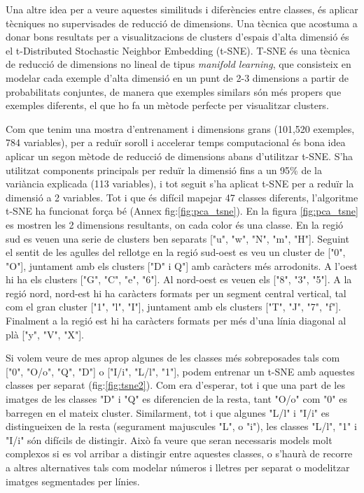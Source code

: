 \documentclass[12pt, spanish]{article}
\begin{document}
Una altre idea per a veure aquestes similituds i diferències entre classes, és aplicar tècniques no supervisades de reducció de dimensions. Una tècnica que acostuma a donar bons resultats per a visualitzacions de clusters d'espais d'alta dimensió és el t-Distributed Stochastic Neighbor Embedding (t-SNE). T-SNE és una tècnica de reducció de dimensions no lineal de tipus \textit{manifold learning}, que consisteix en modelar cada exemple d'alta dimensió en un punt de 2-3 dimensions a partir de probabilitats conjuntes, de manera que exemples similars són més propers que exemples diferents, el que ho fa un mètode perfecte per visualitzar clusters.

Com que tenim una mostra d'entrenament i dimensions grans (101,520 exemples, 784 variables), per a reduïr soroll i accelerar temps computacional és bona idea aplicar un segon mètode de reducció de dimensions abans d'utilitzar t-SNE. S'ha utilitzat components principals per reduïr la dimensió fins a un 95\% de la variància explicada (113 variables), i tot seguit s'ha aplicat t-SNE per a reduïr la dimensió a 2 variables. Tot i que és difícil mapejar 47 classes diferents, l'algoritme t-SNE ha funcionat força bé (Annex fig:\ref{fig:pca_tsne}). En la figura \ref{fig:pca_tsne} es mostren les 2 dimensions resultants, on cada color és una classe. En la regió sud es veuen una serie de clusters ben separats ["u", "w", "N", "m", "H"]. Seguint el sentit de les agulles del rellotge en la regió sud-oest es veu un cluster de ["0", "O"], juntament amb els clusters ["D" i Q"] amb caràcters més arrodonits. A l'oest hi ha els clusters ["G", "C", "e", "6"]. Al nord-oest es veuen els ["8", "3", "5"]. A la regió nord, nord-est hi ha caràcters formats per un segment central vertical, tal com el gran cluster ["1", "l", "I"], juntament amb els clusters ["T", "J", "7", "f"]. Finalment a la regió est hi ha caràcters formats per més d'una línia diagonal al plà ["y", "V", "X"]. 

Si volem veure de mes aprop algunes de les classes més sobreposades tals com ["0", "O/o", "Q", "D"] o ["I/i", "L/l", "1"], podem entrenar un t-SNE amb aquestes classes per separat (fig:\ref{fig:tsne2}). Com era d'esperar, tot i que una part de les imatges de les classes "D" i "Q" es diferencien de la resta, tant "O/o" com "0" es barregen en el mateix cluster. Similarment, tot i que algunes "L/l" i "I/i" es distingueixen de la resta (segurament majuscules "L", o "i"), les classes "L/l", "1" i "I/i" són difícils de distingir. Això fa veure que seran necessaris models molt complexos si es vol arribar a distingir entre aquestes classes, o s'haurà de recorre a altres alternatives tals com modelar números i lletres per separat o modelitzar imatges segmentades per línies.
\end{document}
